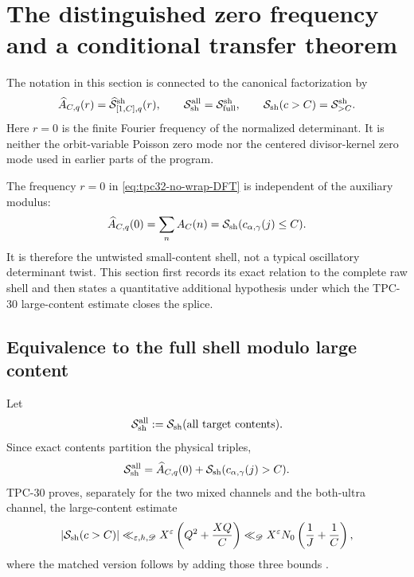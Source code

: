 \section{The distinguished zero frequency and a conditional transfer theorem}
\label{sec:tpc32-zero-frequency-gate}

The notation in this section is connected to the canonical factorization by
\begin{equation}
 \widehat A_{C,q}(r)
 =\widehat{\mathcal S}^{\mathrm{sh}}_{[1,C],q}(r),
 \qquad
 \mathcal S_{\rm sh}^{\rm all}=\mathcal S_{\mathrm{full}}^{\mathrm{sh}},
 \qquad
 \mathcal S_{\rm sh}(c>C)=\mathcal S_{>C}^{\mathrm{sh}}.
 \label{eq:tpc32-zero-notation-crosswalk}
\end{equation}
Here $r=0$ is the finite Fourier frequency of the normalized determinant.
It is neither the orbit-variable Poisson zero mode nor the centered
divisor-kernel zero mode used in earlier parts of the program.

The frequency $r=0$ in
\eqref{eq:tpc32-no-wrap-DFT} is independent of the auxiliary modulus:
\begin{equation}
 \widehat A_{C,q}(0)
 =\sum_nA_C(n)
 =\mathcal S_{\rm sh}(c_{\alpha,\gamma}(j)\le C).
 \label{eq:tpc32-zero-is-small-content}
\end{equation}
It is therefore the untwisted small-content shell, not a typical
oscillatory determinant twist.  This section first records its exact
relation to the complete raw shell and then states a quantitative
additional hypothesis under which the TPC-30 large-content estimate
closes the splice.

\subsection{Equivalence to the full shell modulo large content}

Let
\begin{equation}
 \mathcal S_{\rm sh}^{\rm all}:=\mathcal S_{\rm sh}(\text{all target contents}).
 \label{eq:tpc32-full-matched-shell}
\end{equation}
Since exact contents partition the physical triples,
\begin{equation}
 \mathcal S_{\rm sh}^{\rm all}
 =\widehat A_{C,q}(0)
  +\mathcal S_{\rm sh}(c_{\alpha,\gamma}(j)>C).
 \label{eq:tpc32-zero-full-partition}
\end{equation}
TPC-30 proves, separately for the two mixed channels and the both-ultra
channel, the large-content estimate
\begin{equation}
 |\mathcal S_{\rm sh}(c>C)|
 \ll_{\varepsilon,h,\mathscr D}
 X^\varepsilon\left(Q^2+\frac{XQ}{C}\right)
 \ll_{\mathscr D}
 X^\varepsilon N_0\left(\frac1J+\frac1C\right),
 \label{eq:tpc32-large-content-input}
\end{equation}
where the matched version follows by adding those three bounds
\citep{WangTPC30,WangTPC31}.

